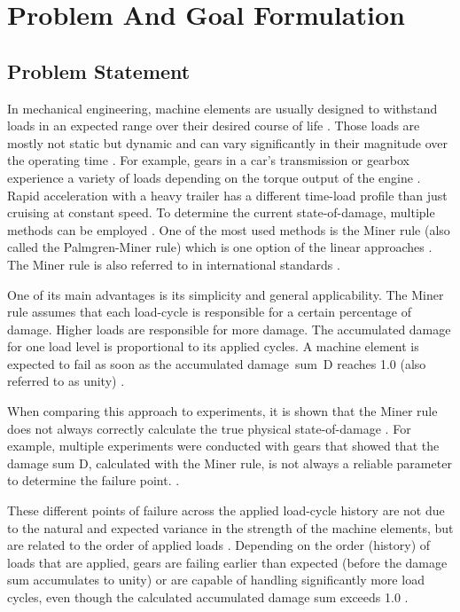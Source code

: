 \section{Problem And Goal Formulation}
\subsection{Problem Statement}\label{prob}

In mechanical engineering, machine elements are usually designed to withstand loads in an expected range over their desired course of life \cite{Vietze}. Those loads are mostly not static but dynamic and can vary significantly in their magnitude over the operating time \cite{Wittel}. For example, gears in a car's transmission or gearbox experience a variety of loads depending on the torque output of the engine \cite{Yuksel}. Rapid acceleration with a heavy trailer has a different time-load profile than just cruising at constant speed.
\newpage
To determine the current state-of-damage, multiple methods can be employed \cite{Lee}. One of the most used methods is the Miner rule \cite{MinerOG} (also called the Palmgren-Miner rule) which is one option of the linear approaches \cite{Sun}. The Miner rule is also referred to in international standards \cite{ISO1}.

One of its main advantages is its simplicity and general applicability. The Miner rule assumes that each load-cycle is responsible for a certain percentage of damage. Higher loads are responsible for more damage. The accumulated damage for one load level is proportional to its applied cycles. A machine element is expected to fail as soon as the accumulated damage~sum~D reaches 1.0 (also referred to as unity) \cite{ISO1, Miller}.

When comparing this approach to experiments, it is shown that the Miner rule does not always correctly calculate the true physical state-of-damage \cite{Pavlou}. For example, multiple experiments were conducted with gears that showed that the damage sum D, calculated with the Miner rule, is not always a reliable parameter to determine the failure point. \cite{Hanumanna}.

These different points of failure across the applied load-cycle history are not due to the natural and expected variance in the strength of the machine elements, but are related to the order of applied loads \cite{Skorupa}. Depending on the order (history) of loads that are applied, gears are failing earlier than expected (before the damage sum accumulates to unity) or are capable of handling significantly more load cycles, even though the calculated accumulated damage sum exceeds 1.0 \cite{Hanumanna}.

